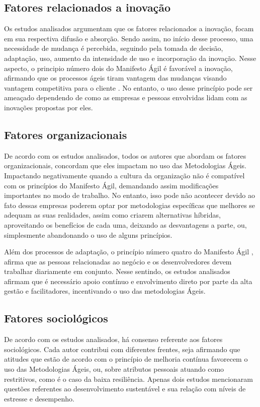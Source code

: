 \subsection{Fatores relacionados a inovação}

Os estudos analisados argumentam que os fatores relacionados a inovação, focam em sua respectiva difusão e absorção. Sendo assim, no início desse processo, uma necessidade de mudança é percebida, seguindo pela tomada de decisão, adaptação, uso, aumento da intensidade de uso e incorporação da inovação. Nesse aspecto, o principio número dois do Manifesto Ágil é favorável a inovação, afirmando que os processos ágeis tiram vantagem das mudanças visando vantagem competitiva para o cliente \cite{Beck2001}. No entanto, o uso desse princípio pode ser ameaçado dependendo de como as empresas e pessoas envolvidas lidam com as inovações propostas por eles.

\subsection{Fatores organizacionais}
De acordo com os estudos analisados, todos os autores que abordam os fatores organizacionais, concordam que eles impactam no uso das Metodologias Ágeis. Impactando negativamente quando a cultura da organização não é compatível com os princípios do Manifesto Ágil, demandando assim modificações importantes no modo de trabalho. No entanto, isso pode não acontecer devido ao fato dessas empresas poderem optar por metodologias específicas que melhores se adequam as suas realidades, assim como criarem alternativas híbridas, aproveitando os benefícios de cada uma, deixando as desvantagens a parte, ou, simplesmente abandonando o uso de alguns princípios.

Além dos processos de adaptação, o princípio número quatro do Manifesto Ágil \cite{Beck2001}, afirma que as pessoas relacionadas ao negócio e os desenvolvedores devem trabalhar diariamente em conjunto. Nesse sentindo, os estudos analisados afirmam que é necessário apoio contínuo e envolvimento direto por parte da alta gestão e facilitadores, incentivando o uso das metodologias Ágeis.

\subsection{Fatores sociológicos}

De acordo com os estudos analisados, há consenso referente aos fatores sociológicos. Cada autor contribui com diferentes frentes, seja afirmando que atitudes que estão de acordo com o princípio de melhoria contínua favorecem o uso das Metodologias Ágeis, ou, sobre atributos pessoais atuando como restritivos, como é o caso da baixa resiliência. Apenas dois estudos mencionaram questões referentes ao desenvolvimento sustentável e sua relação com níveis de estresse e desempenho.

